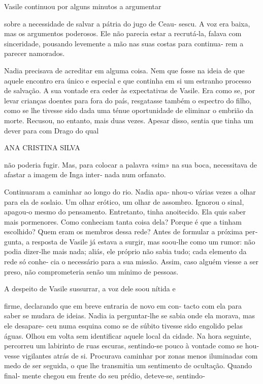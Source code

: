 Vasile continuou por alguns minutos a argumentar

sobre a necessidade de salvar a pátria do jugo de Ceau‑ sescu. A voz era
baixa, mas os argumentos poderosos. Ele não parecia estar a recrutá‑la,
falava com sinceridade, pousando levemente a mão nas suas costas para
continua‑ rem a parecer namorados.

Nadia precisava de acreditar em alguma coisa. Nem que fosse na ideia de
que aquele encontro era único e especial e que continha em si um
estranho processo de salvação. A sua vontade era ceder às expectativas
de Vasile. Era como se, por levar crianças doentes para fora do país,
resgatasse também o espectro do filho, como se lhe tivesse sido dada uma
ténue oportunidade de eliminar o embrião da morte. Recusou, no entanto,
mais duas vezes. Apesar disso, sentia que tinha um dever para com Drago
do qual

ANA CRISTINA SILVA

não poderia fugir. Mas, para colocar a palavra «sim» na sua boca,
necessitava de afastar a imagem de Inga inter‑ nada num orfanato.

Continuaram a caminhar ao longo do rio. Nadia apa‑ nhou‑o várias vezes a
olhar para ela de soslaio. Um olhar erótico, um olhar de assombro.
Ignorou o sinal, apagou‑o mesmo do pensamento. Entretanto, tinha
anoitecido. Ela quis saber mais pormenores. Como conheciam tanta coisa
dela? Porque é que a tinham escolhido? Quem eram os membros dessa rede?
Antes de formular a próxima per‑ gunta, a resposta de Vasile já estava a
surgir, mas soou‑lhe como um rumor: não podia dizer‑lhe mais nada;
aliás, ele próprio não sabia tudo; cada elemento da rede só conhe‑ cia o
necessário para a sua missão. Assim, caso alguém viesse a ser preso, não
comprometeria senão um mínimo de pessoas.

A despeito de Vasile sussurrar, a voz dele soou nítida e

firme, declarando que em breve entraria de novo em con‑ tacto com ela
para saber se mudara de ideias. Nadia ia perguntar‑lhe se sabia onde ela
morava, mas ele desapare‑ ceu numa esquina como se de súbito tivesse
sido engolido pelas águas. Olhou em volta sem identificar aquele local
da cidade. Na hora seguinte, percorreu um labirinto de ruas escuras,
sentindo‑se pouco à vontade como se hou‑ vesse vigilantes atrás de si.
Procurava caminhar por zonas menos iluminadas com medo de ser seguida, o
que lhe transmitia um sentimento de ocultação. Quando final‑ mente
chegou em frente do seu prédio, deteve‑se, sentindo‑

